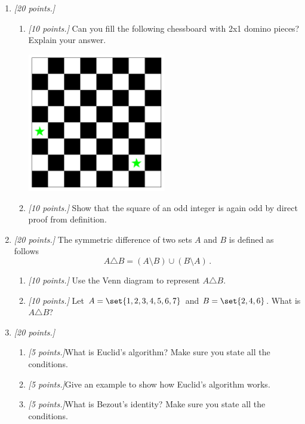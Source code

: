 \documentclass[12pt]{amsart}
\begin{document}
\begin{enumerate}[label=\arabic*.,itemsep=10pt, leftmargin=*]
	\item\textit{[20 points.]}
	      \begin{enumerate}
		      \item \textit{[10 points.]}
		            Can you fill the following chessboard with 2x1 domino pieces? Explain your answer.
		            \begin{center}
			            \includegraphics[width=0.5\textwidth]{Checker1.pdf}
		            \end{center}
		            \vspace{5cm}

		      \item \textit{[10 points.]}
		            Show that the square of an odd integer is again odd by direct proof
		            from definition.


	      \end{enumerate}
	      \newpage
	\item\textit{[20 points.]}
	      The symmetric difference of two sets $A$ and $B$ is defined as follows
	      \begin{equation*}
		      A \triangle B = (A\setminus B) \cup (B\setminus A) \,.
	      \end{equation*}
	      \begin{enumerate}
		      \item \textit{[10 points.]}
		            Use the Venn diagram to represent $A \triangle B$.
		      \item \textit{[10 points.]}
		            Let $A = \set{1,2,3,4,5,6,7}$ and $B = \set{2,4,6}$. What is $A\triangle B$?
	      \end{enumerate}
	      \newpage


	\item\textit{[20 points.]}
	      \begin{enumerate}
		      \item \textit{[5 points.]}What is Euclid's algorithm? Make sure you state all the conditions.
		            \vspace{4cm}
		      \item \textit{[5 points.]}Give an example to show how Euclid's algorithm works.
		            \vspace{4cm}
		      \item \textit{[5 points.]}What is Bezout's identity? Make sure you state all the conditions.


\end{enumerate}
\end{enumerate}
\end{document}
